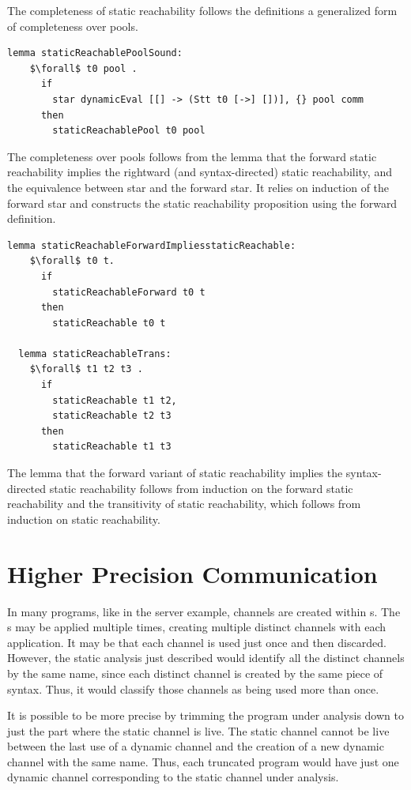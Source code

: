 \documentclass[letterpaper, 11pt]{extarticle}
\begin{document}
The completeness of static reachability follows the definitions
a generalized form of completeness over pools.

\begin{lstlisting}[language=logic, mathescape]
  lemma staticReachablePoolSound:
    $\forall$ t0 pool .
      if
        star dynamicEval [[] -> (Stt t0 [->] [])], {} pool comm 
      then
        staticReachablePool t0 pool
\end{lstlisting}

The completeness over pools follows from the lemma that the forward
static reachability implies the rightward (and syntax-directed) static reachability,
and the equivalence between star and the forward star.  It relies on induction of the
forward star and constructs the static reachability
proposition using the forward definition.  

\begin{lstlisting}[language=logic, mathescape]
  lemma staticReachableForwardImpliesstaticReachable:
    $\forall$ t0 t. 
      if
        staticReachableForward t0 t
      then
        staticReachable t0 t

  lemma staticReachableTrans:
    $\forall$ t1 t2 t3 .
      if 
        staticReachable t1 t2,
        staticReachable t2 t3
      then
        staticReachable t1 t3
\end{lstlisting}

The lemma that the forward variant of static reachability implies the syntax-directed static
reachability follows from induction on the forward static reachability and the
transitivity of static reachability, which follows from induction on static reachability.

\section{Higher Precision Communication} \label{high-precision}
In many programs, like in the server example, channels are created within s.
The s may be applied multiple times, creating multiple distinct channels
with each application. It may be that each channel is used just once and then discarded.
However, the static analysis just described would identify all the distinct channels by the
same name, since each distinct channel is created by the same piece of syntax.
Thus, it would classify those channels as being used more than once.

It is possible to be more precise by trimming the program under analysis down to just the part
where the static channel is live. The static channel cannot be live between the last use of a
dynamic channel and the creation of a new dynamic channel with the same name.  Thus, each
truncated program would have just one dynamic channel corresponding to the static channel under
analysis. 
\end{document}

